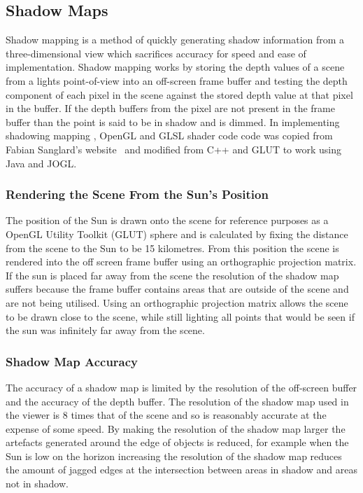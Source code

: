 \documentclass[12pt]{report}
\begin{document}
\subsection{Shadow Maps}
Shadow mapping is a method of quickly generating shadow information from a three-dimensional view which sacrifices accuracy for speed and ease of implementation. Shadow mapping works by storing the depth values of a scene from a lights point-of-view into an off-screen frame buffer and testing the depth component of each pixel in the scene against the stored depth value at that pixel in the buffer. If the depth buffers from the pixel are not present in the frame buffer than the point is said to be in shadow and is dimmed. In implementing shadowing mapping , OpenGL and GLSL shader code code was copied from Fabian Sanglard's website~\cite{shadowb} and modified from C++ and GLUT to work using Java and JOGL.

\subsubsection{Rendering the Scene From the Sun's Position}
The position of the Sun is drawn onto the scene for reference purposes as a OpenGL Utility Toolkit (GLUT) sphere and is calculated by fixing the distance from the scene to the Sun to be 15 kilometres. From this position the scene is rendered into the off screen frame buffer using an orthographic projection matrix. If the sun is placed far away from the scene the resolution of the shadow map suffers because the frame buffer contains areas that are outside of the scene and are not being utilised. Using an orthographic projection matrix allows the scene to be drawn close to the scene, while still lighting all points that would be seen if the sun was infinitely far away from the scene.

\subsubsection{Shadow Map Accuracy}
The accuracy of a shadow map is limited by the resolution of the off-screen buffer and the accuracy of the depth buffer. The resolution of the shadow map used in the viewer is 8 times that of the scene and so is reasonably accurate at the expense of some speed. By making the resolution of the shadow map larger the artefacts generated around the edge of objects is reduced, for example when the Sun is low on the horizon increasing the resolution of the shadow map reduces the amount of jagged edges at the intersection between areas in shadow and areas not in shadow. 
\end{document}
